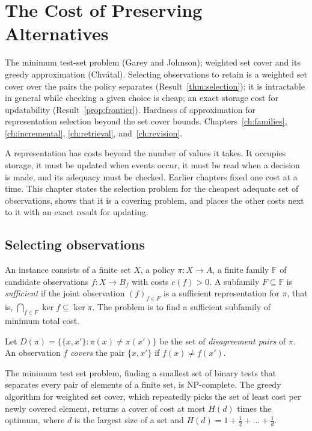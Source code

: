 \chapter{The Cost of Preserving Alternatives}\label{ch:cost}
{The minimum test-set problem (Garey and Johnson); weighted set cover and its greedy approximation (Chv\'atal).}
{Selecting observations to retain is a weighted set cover over the pairs the policy separates (Result~\ref{thm:selection}); it is intractable in general while checking a given choice is cheap; an exact storage cost for updatability (Result~\ref{prop:frontier}).}
{Hardness of approximation for representation selection beyond the set cover bounds.}
{Chapters~\ref{ch:families}, \ref{ch:incremental}, \ref{ch:retrieval}, and~\ref{ch:revision}.}

A representation has costs beyond the number of values it takes. It occupies storage, it must be updated when events occur, it must be read when a decision is made, and its adequacy must be checked. Earlier chapters fixed one cost at a time. This chapter states the selection problem for the cheapest adequate set of observations, shows that it is a covering problem, and places the other costs next to it with an exact result for updating.

\section{Selecting observations}

\begin{definition}\label{def:selection}
An instance consists of a finite set $X$, a policy $\pi:X\to A$, a finite family $\mathbb F$ of candidate observations $f:X\to B_f$ with costs $c(f)>0$. A subfamily $F\subseteq\mathbb F$ is \emph{sufficient} if the joint observation $(f)_{f\in F}$ is a sufficient representation for $\pi$, that is, $\bigcap_{f\in F}\ker f\subseteq\ker\pi$. The problem is to find a sufficient subfamily of minimum total cost.
\end{definition}

Let $D(\pi)=\{\{x,x'\}:\pi(x)\ne\pi(x')\}$ be the set of \emph{disagreement pairs} of $\pi$. An observation $f$ \emph{covers} the pair $\{x,x'\}$ if $f(x)\ne f(x')$.

\begin{established}\label{thm:testset}
The minimum test set problem, finding a smallest set of binary tests that separates every pair of elements of a finite set, is NP-complete. The greedy algorithm for weighted set cover, which repeatedly picks the set of least cost per newly covered element, returns a cover of cost at most $H(d)$ times the optimum, where $d$ is the largest size of a set and $H(d)=1+\tfrac12+\dots+\tfrac1d$.
\end{established}

